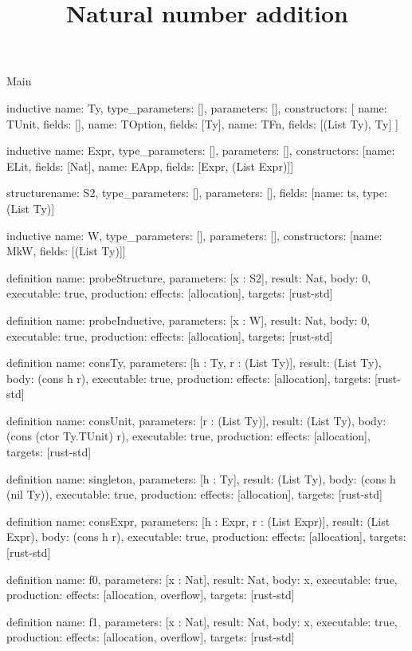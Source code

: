 \begin{lexlean}{Main}
\title{Natural number addition}
\begin{semanticmodule}
inductive{
  name: Ty,
  type_parameters: [],
  parameters: [],
  constructors: [
    {name: TUnit, fields: []},
    {name: TOption, fields: [Ty]},
    {name: TFn, fields: [(List Ty), Ty]}
  ]
}

inductive{
  name: Expr,
  type_parameters: [],
  parameters: [],
  constructors: [{name: ELit, fields: [Nat]}, {name: EApp, fields: [Expr, (List Expr)]}]
}

structure{name: S2, type_parameters: [], parameters: [], fields: [{name: ts, type: (List Ty)}]}

inductive{
  name: W,
  type_parameters: [],
  parameters: [],
  constructors: [{name: MkW, fields: [(List Ty)]}]
}

definition{
  name: probeStructure,
  parameters: [x : S2],
  result: Nat,
  body: 0,
  executable: true,
  production: {effects: [allocation], targets: [rust-std]}
}

definition{
  name: probeInductive,
  parameters: [x : W],
  result: Nat,
  body: 0,
  executable: true,
  production: {effects: [allocation], targets: [rust-std]}
}

definition{
  name: consTy,
  parameters: [h : Ty, r : (List Ty)],
  result: (List Ty),
  body: (cons h r),
  executable: true,
  production: {effects: [allocation], targets: [rust-std]}
}

definition{
  name: consUnit,
  parameters: [r : (List Ty)],
  result: (List Ty),
  body: (cons (ctor Ty.TUnit) r),
  executable: true,
  production: {effects: [allocation], targets: [rust-std]}
}

definition{
  name: singleton,
  parameters: [h : Ty],
  result: (List Ty),
  body: (cons h (nil Ty)),
  executable: true,
  production: {effects: [allocation], targets: [rust-std]}
}

definition{
  name: consExpr,
  parameters: [h : Expr, r : (List Expr)],
  result: (List Expr),
  body: (cons h r),
  executable: true,
  production: {effects: [allocation], targets: [rust-std]}
}

definition{
  name: f0,
  parameters: [x : Nat],
  result: Nat,
  body: x,
  executable: true,
  production: {effects: [allocation, overflow], targets: [rust-std]}
}

definition{
  name: f1,
  parameters: [x : Nat],
  result: Nat,
  body: x,
  executable: true,
  production: {effects: [allocation, overflow], targets: [rust-std]}
}


\end{semanticmodule}
\end{lexlean}
